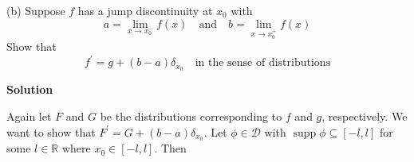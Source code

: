 \documentclass{article}
\DeclareMathOperator\supp{supp}
\begin{document}
\vspace{5mm}

(b) Suppose $f$ has a jump discontinuity at $x_0$ with
%
\begin{equation*}
    a = \lim_{x \rightarrow x_0^-} f(x)
        \quad \text {and} \quad
    b = \lim_{x \rightarrow x_0^+} f(x)
\end{equation*}
%
Show that
%
\begin{equation*}
    f^{\prime} =g + (b - a) \delta_{x_0} \quad \text {in the sense of distributions}
\end{equation*}

\textbf{Solution}

Again let $F$ and $G$ be the distributions corresponding to $f$ and $g$,
respectively. We want to show that
$F^\prime = G + (b - a) \delta_{x_0}$. Let $\phi \in \mathcal{D}$ with
$\supp \phi \subseteq [-l, l]$ for some $l \in \mathbb{R}$ where
$x_0 \in [-l, l]$. Then
%
\end{document}
